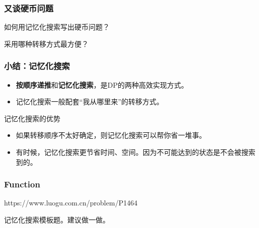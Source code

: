\documentclass{beamer}
\begin{document}
\begin{frame}
    \frametitle{又谈硬币问题}

    如何用记忆化搜索写出硬币问题？

    采用哪种转移方式最方便？

\end{frame}

\begin{frame}
    \frametitle{小结：记忆化搜索}

    \begin{itemize}
        \item \textbf{按顺序递推}和\textbf{记忆化搜索}，是DP的两种高效实现方式。
        \item 记忆化搜索一般配套“我从哪里来”的转移方式。
    \end{itemize}

    \begin{block}{记忆化搜索的优势}
        \begin{itemize}
            \item 如果转移顺序不太好确定，则记忆化搜索可以帮你省一堆事。
            \item 有时候，记忆化搜索更节省时间、空间。因为不可能达到的状态是不会被搜索到的。
        \end{itemize}
    \end{block}

\end{frame}

\begin{frame}
    \frametitle{Function}

    https://www.luogu.com.cn/problem/P1464
    \pause

    记忆化搜索模板题。建议做一做。

\end{frame}
\end{document}
